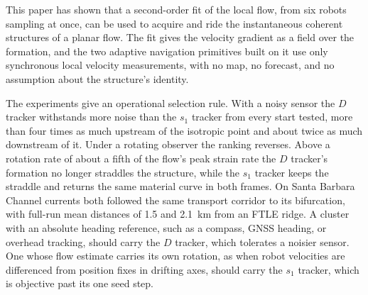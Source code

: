 \documentclass[lettersize,journal]{IEEEtran}
\begin{document}
This paper has shown that a second-order fit of the local flow, from six
robots sampling at once, can be used to acquire and ride the instantaneous
coherent structures of a planar flow. The fit gives the velocity gradient
as a field over the formation, and the two adaptive navigation primitives
built on it use only synchronous local velocity measurements, with no
map, no forecast, and no assumption about the structure's identity.

The experiments give an operational selection rule. With a noisy sensor
the $D$ tracker withstands more noise than the $s_1$ tracker from every start tested, more than four times as much upstream of the isotropic point and about twice as much downstream of it. Under a rotating observer the
ranking reverses. Above a rotation rate of about a fifth of the flow's peak strain rate the $D$ tracker's formation
no longer straddles the structure, while the $s_1$ tracker keeps the
straddle and returns the same material curve in both frames. On Santa Barbara Channel currents both followed the same transport corridor
to its bifurcation, with full-run mean distances of 1.5 and 2.1~km from an FTLE ridge. A cluster with an absolute heading reference, such as a compass, GNSS
heading, or overhead tracking, should carry the $D$ tracker, which
tolerates a noisier sensor. One whose flow estimate carries its own rotation, as when robot
velocities are differenced from position fixes in drifting axes, should
carry the $s_1$ tracker, which is objective past its one seed step.
\end{document}
